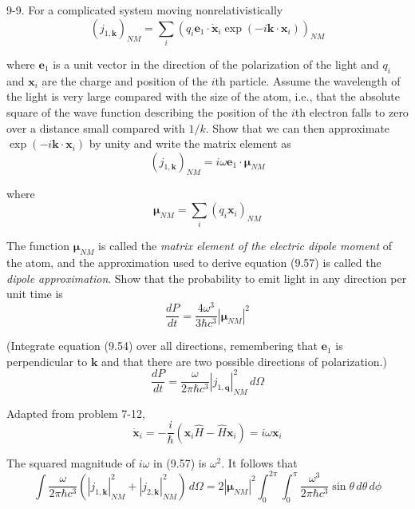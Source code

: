 \documentclass[12pt]{article}
\begin{document}
9-9.
For a complicated system moving nonrelativistically
\begin{equation*}
(j_{1,\mathbf k})_{NM}=\sum_i\left(
q_i\mathbf e_1\cdot\dot{\mathbf x}_i
\exp(-i\mathbf k\cdot\mathbf x_i)\right)_{NM}
\end{equation*}

where $\mathbf e_1$ is a unit vector in the direction of the
polarization of the light and $q_i$ and $\mathbf x_i$ are the
charge and position of the $i$th particle.
Assume the wavelength of the light is very large compared with the
size of the atom, i.e., that the absolute square of the wave function
describing the position of the $i$th electron falls to zero over a
distance small compared with $1/k$.
Show that we can then approximate $\exp(-i\mathbf k\cdot\mathbf x_i)$
by unity and write the matrix element as
\begin{equation*}
(j_{1,\mathbf k})_{NM}=i\omega\mathbf e_1\cdot\boldsymbol\mu_{NM}
\tag{9.57}
\end{equation*}

where
\begin{equation*}
\boldsymbol\mu_{NM}=\sum_i(q_i\mathbf x_i)_{NM}
\tag{9.58}
\end{equation*}

The function $\boldsymbol\mu_{NM}$ is called the
{\it matrix element of the electric dipole moment}
of the atom, and the approximation used to derive equation (9.57)
is called the {\it dipole approximation}.
Show that the probability to emit light in any direction per unit time is
\begin{equation*}
\frac{dP}{dt}=\frac{4\omega^3}{3\hbar c^3}\left|\boldsymbol\mu_{NM}\right|^2
\tag{9.59}
\end{equation*}

(Integrate equation (9.54) over all directions, remembering that
$\mathbf e_1$ is perpendicular to $\mathbf k$ and that there are two
possible directions of polarization.)
\begin{equation*}
\frac{dP}{dt}=\frac{\omega}{2\pi\hbar c^3}\left|j_{1,\mathbf q}\right|_{NM}^2
\,d\Omega
\tag{9.54}
\end{equation*}

Adapted from problem 7-12,
\begin{equation*}
\dot{\mathbf x}_i=-\frac{i}{\hbar}(\mathbf x_i\hat H-\hat H\mathbf x_i)=i\omega\mathbf x_i
\end{equation*}

The squared magnitude of $i\omega$ in (9.57) is $\omega^2$.
It follows that
\begin{equation*}
\int\frac{\omega}{2\pi\hbar c^3}
\left(\left|j_{1,\mathbf k}\right|_{NM}^2+\left|j_{2,\mathbf k}\right|_{NM}^2\right)
\,d\Omega
=2\left|\boldsymbol\mu_{NM}\right|^2
\int_0^{2\pi}\int_0^\pi
\frac{\omega^3}{2\pi\hbar c^3}
\sin\theta
\,d\theta\,d\phi
\end{equation*}
\end{document}
